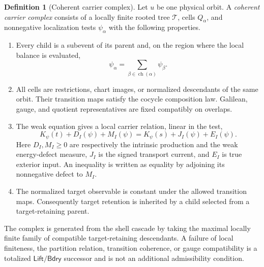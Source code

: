 \documentclass[11pt]{article}
\numberwithin{section}{part}
\theoremstyle{plain}
\theoremstyle{definition}
\newtheorem{definition}[definition]{Definition}
\theoremstyle{remark}
\newcommand{\Lift}{\mathsf{Lift}}
\newcommand{\Bdry}{\mathsf{Bdry}}
\begin{document}
\begin{definition}[Coherent carrier complex]
\label{def:coherent-carrier-complex}
Let \(u\) be one physical orbit.  A \emph{coherent carrier complex} consists
of a locally finite rooted tree \(\mathcal T\), cells \(Q_\alpha\), and
nonnegative localization tests \(\psi_\alpha\) with the following
properties.
\begin{enumerate}[label=\textup{(C\arabic*)}]
\item Every child is a subevent of its parent and, on the region where the
  local balance is evaluated,
  \begin{equation}
   \label{eq:carrier-partition}
   \psi_\alpha=
   \sum_{\beta\in\operatorname{ch}(\alpha)}\psi_\beta.
  \end{equation}
\item All cells are restrictions, chart images, or normalized descendants of
  the same orbit.  Their transition maps satisfy the cocycle composition
  law.  Galilean, gauge, and quotient representatives are fixed compatibly on
  overlaps.
\item The weak equation gives a local carrier relation, linear in the test,
  \begin{equation}
   \label{eq:local-carrier-relation}
   K_\psi(t)+D_I(\psi)+M_I(\psi)
   =K_\psi(s)+J_I(\psi)+E_I(\psi).
  \end{equation}
  Here \(D_I,M_I\ge0\) are respectively the intrinsic production and the
  weak energy-defect measure, \(J_I\) is the signed transport current, and
  \(E_I\) is true exterior input.  An inequality is written as equality by
  adjoining its nonnegative defect to \(M_I\).
\item The normalized target observable is constant under the allowed
  transition maps.  Consequently target retention is inherited by a child
  selected from a target-retaining parent.
\end{enumerate}
The complex is generated from the shell cascade by taking the maximal
locally finite family of compatible target-retaining descendants.  A failure
of local finiteness, the partition relation, transition coherence, or gauge
compatibility is a totalized \(\Lift/\Bdry\) successor and is not an
additional admissibility condition.
\end{definition}
\end{document}
